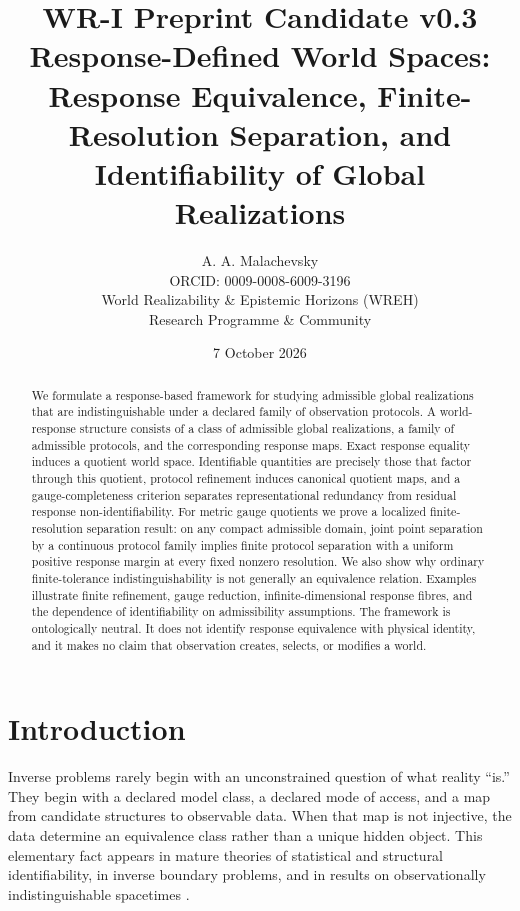 \documentclass[11pt]{article}
\title{\textbf{WR-I Preprint Candidate v0.3}\\[4pt]
\large Response-Defined World Spaces:\\
Response Equivalence, Finite-Resolution Separation, and Identifiability of Global Realizations}
\author{A. A. Malachevsky\\
ORCID: 0009-0008-6009-3196\\
World Realizability \& Epistemic Horizons (WREH)\\
Research Programme \& Community}
\date{7 October 2026}
\begin{document}
\maketitle

\begin{abstract}
We formulate a response-based framework for studying admissible global
realizations that are indistinguishable under a declared family of observation
protocols. A world-response structure consists of a class of admissible global
realizations, a family of admissible protocols, and the corresponding response
maps. Exact response equality induces a quotient world space. Identifiable
quantities are precisely those that factor through this quotient, protocol
refinement induces canonical quotient maps, and a gauge-completeness criterion
separates representational redundancy from residual response
non-identifiability. For metric gauge quotients we prove a localized
finite-resolution separation result: on any compact admissible domain, joint
point separation by a continuous protocol family implies finite protocol
separation with a uniform positive response margin at every fixed nonzero
resolution. We also show why ordinary finite-tolerance indistinguishability is
not generally an equivalence relation. Examples illustrate finite refinement,
gauge reduction, infinite-dimensional response fibres, and the dependence of
identifiability on admissibility assumptions. The framework is ontologically
neutral. It does not identify response equivalence with physical identity, and
it makes no claim that observation creates, selects, or modifies a world.
\end{abstract}

\section{Introduction}

Inverse problems rarely begin with an unconstrained question of what reality
``is.'' They begin with a declared model class, a declared mode of access, and
a map from candidate structures to observable data. When that map is not
injective, the data determine an equivalence class rather than a unique hidden
object. This elementary fact appears in mature theories of statistical and
structural identifiability, in inverse boundary problems, and in results on
observationally indistinguishable spacetimes
\cite{Rothenberg1971,Saccomani2003,Bellu2007,Villaverde2016,MeshkatSullivant2014,Manchak2009}.
\end{document}
